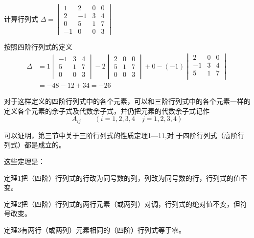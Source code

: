 \begin{example}
    计算行列式 $\Delta =\begin{vmatrix}
        1&2&0&0\\
        2&-1&3&4\\
        0&5&1&7\\
        -1&0&0&3
    \end{vmatrix}$
\end{example}


\begin{solution}
按照四阶行列式的定义
\[\begin{split}
\Delta&=1\begin{vmatrix}
    -1&3&4\\
    5&1&7\\
    0&0&3
\end{vmatrix}-2\begin{vmatrix}
    2&0&0\\ 5&1&7\\
    0&0&3
\end{vmatrix}+0-(-1)\begin{vmatrix}
    2&0&0\\-1&3&4\\5&1&7\\
\end{vmatrix}\\
&=-48-12+34=-26
\end{split}\]
\end{solution}

对于这样定义的四阶行列式中的各个元素，可以和三阶行列式中的各个元素一样的定义各个元素的余子式及代数余子式，并仍把元素的代数余子式记作
\[A_{ij}\qquad  (i=1,2,3,4\quad  j=1,2,3,4)\]

可以证明，第三节中关于三阶行列式的性质定理1—11,对
于四阶行列式（高阶行列式）都是成立的。

这些定理是：

\begin{blk}
    {定理1}把（四阶）行列式的行改为同号数的列，列改为同号数的行，行列式的值不变。
\end{blk}

\begin{blk}
    {定理2}把（四阶）行列式的两行元素（或两列）对调，行列式的绝对值不变，但符号改变。
\end{blk}

\begin{blk}
    {定理3}有两行（或两列）元素相同的（四阶）行列式等于零。
\end{blk}

